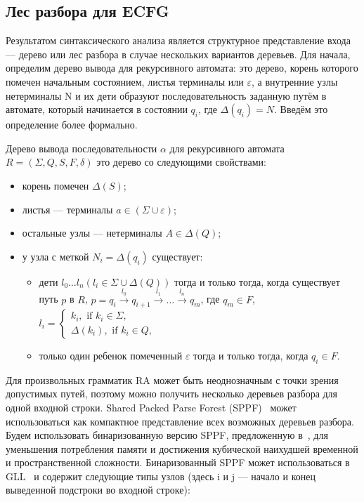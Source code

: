\subsection{Лес разбора для ECFG}
Результатом синтаксического анализа является структурное представление 
входа --- дерево или лес разбора в случае нескольких вариантов деревьев.
Для начала, определим дерево вывода для рекурсивного автомата: 
это дерево, корень которого помечен начальным состоянием, листья терминалы или $\varepsilon$,
а внутренние узлы нетерминалы N и их
дети образуют последовательность заданную путём в автомате, который начинается в 
состоянии $q_i$, где $ \Delta(q_i) = N $. Введём это определение более формально.

\begin{mydef}
	
	Дерево вывода последовательности $\alpha$ для рекурсивного автомата $R=(\Sigma, Q, S, F, \delta)$ это дерево со следующими свойствами:
	
	\begin{itemize}
		\item корень помечен $\Delta(S)$;
		\item листья --- терминалы $a\in (\Sigma \cup \varepsilon)$;
		\item остальные узлы --- нетерминалы $A\in \Delta(Q)$;
		\item у узла с меткой $N_i = \Delta(q_i)$ существует:
		\begin{itemize}
			\item 
			дети $l_0 \dots l_n (l_i \in \Sigma \cup \Delta(Q))$ тогда и только тогда,
			когда существует путь $p$ в $R$, $p = q_i \xrightarrow[]{l_0} q_{i+1} \xrightarrow[]{l_1} \dots \xrightarrow{l_n} q_m$, где
			$q_m \in F$, $l_i = 
			\left\{
			\begin{matrix}
			k_i, \text{ if } k_i \in \Sigma,\\
			\Delta(k_i), \text{ if } k_i \in Q,
			\end{matrix}
			\right.
			$
			\item только один ребенок помеченный $\varepsilon$ тогда и только тогда,
			когда $ q_i \in F $.
		\end{itemize}
	\end{itemize}
\end{mydef}
Для произвольных грамматик RA может быть неоднозначным с точки зрения допустимых путей,
поэтому можно получить несколько деревьев разбора для одной входной строки.
Shared Packed Parse Forest (SPPF)~\cite{SPPFa} может использоваться как компактное
представление всех возможных деревьев разбора. Будем использовать бинаризованную версию SPPF,
предложенную в~\cite{brnglr}, для уменьшения потребления памяти и достижения кубической
наихудшей временной и пространственной сложности. Бинаризованный SPPF может использоваться
в GLL~\cite{scott2013gll} и содержит следующие типы узлов (здесь i и j --- начало и конец выведенной подстроки во входной строке):

